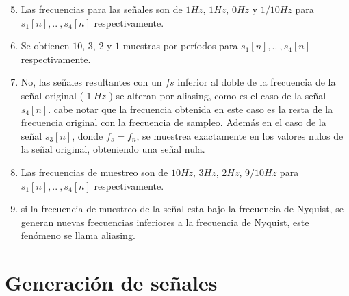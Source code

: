 \documentclass[letterpaper,onecolumn,10pt,journal,final]{IEEEtran}
\begin{document}
\begin{enumerate}[{1)}]
    \setcounter{enumi}{4}
    \item Las frecuencias para las señales son de $1Hz$, $1Hz$, $0Hz$ y $1/10Hz$ para $s_1[n], .. ~ ,s_4[n]$ respectivamente.
    \item Se obtienen $10$, $3$, $2$ y $1$ muestras por períodos para $s_1[n], .. ~ ,s_4[n]$ respectivamente.
    \item No, las señales resultantes con un $fs$ inferior al doble de la frecuencia de la señal original ( $1~Hz$ ) se alteran por aliasing, como es el caso de la señal $s_4[n]$. cabe notar que la frecuencia obtenida en este caso es la resta de la frecuencia original con la frecuencia de sampleo.
    Además en el caso de la señal $s_3[n]$, donde $f_s = f_n$, se muestrea exactamente en los valores nulos de la señal original, obteniendo una señal nula.
    \item Las frecuencias de muestreo son de $10Hz$, $3Hz$, $2Hz$, $9/10Hz$ para $s_1[n], .. ~ ,s_4[n]$ respectivamente.
    \item si la frecuencia de muestreo de la señal esta bajo la frecuencia de Nyquist, se generan nuevas frecuencias inferiores a la frecuencia de Nyquist, este fenómeno se llama aliasing.
\end{enumerate}

%
%
\section{Generación de señales}
\end{document}
